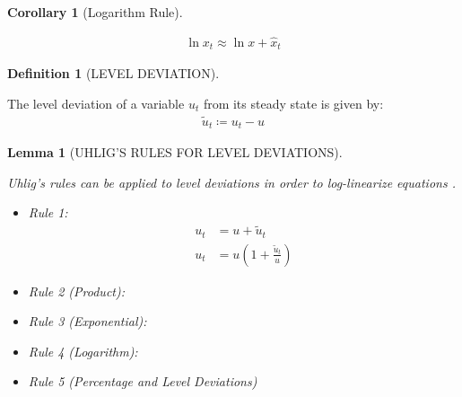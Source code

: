 \documentclass[
	12pt, 
	]{article}
\numberwithin{equation}{section}
\theoremstyle{definition}
\newtheorem{definition}{Definition}[section]
\theoremstyle{plain}
\theoremstyle{plain}
\newtheorem{lemma}{Lemma}[section]
\theoremstyle{plain}
\newtheorem{corollary}{Corollary}[lemma]
\begin{document}
\begin{corollary}[Logarithm Rule]\label{coro:logarithm-rule}

\begin{align*}
	\ln x_t \approx \ln x + \hat{x}_t
\end{align*}
	
\end{corollary}


\begin{definition}[LEVEL DEVIATION]\label{def:level-deviation}
	
	The level deviation of a variable $u_t$ from its steady state is given by: \cite[Lecture 9, p.9]{solis-garcia_ucb_2022}
	\begin{align}
		\widetilde{u}_t \coloneq u_t - u \label{eq:level-deviation}
	\end{align}
	
\end{definition}


\begin{lemma}[UHLIG'S RULES FOR LEVEL DEVIATIONS]\label{lemma:level-rules}
	
	Uhlig's rules can be applied to level deviations in order to log-linearize equations \cite[Lecture 6, p.2]{solis-garcia_ucb_2022}.
	
	\begin{itemize}
		\item Rule 1:
		\begin{align}
		\label{lemma:level-rule-1a}
			u_t &= u + \widetilde{u}_t \\
		\label{lemma:level-rule-1b}
			u_t &= u\left(1+ \frac{\widetilde{u}_t}{u} \right)
		\end{align}
				
		\item Rule 2 (Product):
		
		\item Rule 3 (Exponential):
		
		\item Rule 4 (Logarithm):
		
		\item Rule 5 (Percentage and Level Deviations)
		
	\end{itemize}
	
\end{lemma}
\end{document}
